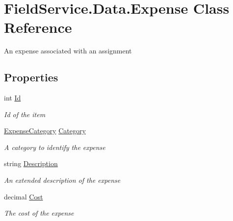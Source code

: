 \hypertarget{class_field_service_1_1_data_1_1_expense}{\section{Field\+Service.\+Data.\+Expense Class Reference}
\label{class_field_service_1_1_data_1_1_expense}
}


An expense associated with an assignment  


\subsection*{Properties}
\begin{DoxyCompactItemize}
\item 
int \hyperlink{class_field_service_1_1_data_1_1_expense_aa52fab6bcef532f409acbc1b74efc8a2}{Id}
\begin{DoxyCompactList}\small\item\em Id of the item \end{DoxyCompactList}\item 
\hyperlink{namespace_field_service_1_1_data_a6565a839d23a4c941ba4a771c1e22163}{Expense\+Category} \hyperlink{class_field_service_1_1_data_1_1_expense_adf4d52782e255df6159d3875107a36e9}{Category}
\begin{DoxyCompactList}\small\item\em A category to identify the expense \end{DoxyCompactList}\item 
string \hyperlink{class_field_service_1_1_data_1_1_expense_acc079177bac1716caa5d28df4e453a6d}{Description}
\begin{DoxyCompactList}\small\item\em An extended description of the expense \end{DoxyCompactList}\item 
decimal \hyperlink{class_field_service_1_1_data_1_1_expense_ae348a76981516e1e6345edcd88ab1821}{Cost}
\begin{DoxyCompactList}\small\item\em The cost of the expense \end{DoxyCompactList}\item 

\end{DoxyCompactItemize}
